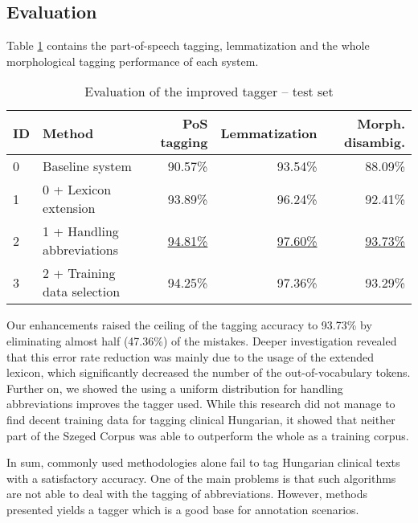 \subsection{Evaluation}

Table \ref{tab:improvements} contains the part-of-speech tagging, lemmatization and the whole morphological tagging performance of each system.

\begin{table}[h]
\centering
\caption{Evaluation of the improved tagger -- test set}
\label{tab:improvements}
\begin{tabular}{ l l r r r} 
\hline
ID & Method & PoS tagging & Lemmatization & Morph. disambig. \\
\hline
0 & Baseline system & 90.57\% & 93.54\% & 88.09\% \\
1 & 0 + Lexicon extension & 93.89\% & 96.24\% & 92.41\% \\
2 & 1 + Handling abbreviations & \underline{94.81\%} & \underline{97.60\%} & \underline{93.73\%} \\
3 & 2 + Training data selection & 94.25\% & 97.36\% & 93.29\% \\
\hline
\end{tabular}
\end{table}

Our enhancements raised the ceiling of the tagging accuracy to 93.73\% by eliminating almost half (47.36\%) of the mistakes. Deeper investigation revealed that this error rate reduction was mainly due to the usage of the extended lexicon, which significantly decreased the number of the out-of-vocabulary tokens. 
Further on, we showed the using a uniform distribution for handling abbreviations improves the tagger used.
While this research did not manage to find decent training data for tagging clinical Hungarian, it showed that neither part of the Szeged Corpus was able to outperform the whole as a training corpus. 

In sum, commonly used methodologies alone fail to tag Hungarian clinical texts with a satisfactory accuracy. One of the main problems is that such algorithms are not able to deal with the tagging of abbreviations. However, methods presented yields a tagger which is a good base for annotation scenarios.

